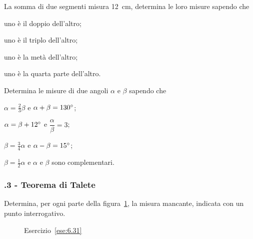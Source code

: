 \begin{multicols}{2}
\begin{esercizio}
\label{ese:6.29}
La somma di due segmenti misura 12~cm, determina le loro misure sapendo che
\begin{enumeratea}
\item uno è il doppio dell'altro;
\item uno è il triplo dell'altro;
\item uno è la metà dell'altro;
\item uno è la quarta parte dell'altro.
\end{enumeratea}
\end{esercizio}

\begin{esercizio}
\label{ese:6.30}
Determina le misure di due angoli $\alpha$ e $\beta$ sapendo che
\begin{enumeratea}
\item $\alpha = \frac{2}{3}\beta$ e $\alpha+\beta=130{}^{\circ}$;
\item $\alpha = \beta + 12{}^{\circ}$ e $\dfrac{\alpha}{\beta}=3$;
\item $\beta = \frac{3}{4}\alpha$ e $\alpha-\beta=15{}^{\circ}$;
\item $\beta=\frac{1}{2}\alpha$ e $\alpha$ e $\beta$ sono complementari.
\end{enumeratea}
\end{esercizio}

\end{multicols}

\subsubsection*{\thechapter.3 - Teorema di Talete}

\begin{esercizio}
\label{ese:6.31}
Determina, per ogni parte della figura~\ref{fig:ese6.31}, la misura mancante, indicata con un punto interrogativo.
\end{esercizio}

\begin{figure}[!htb]
	\centering
	\caption{Esercizio~\ref{ese:6.31}}\label{fig:ese6.31}
\end{figure}

